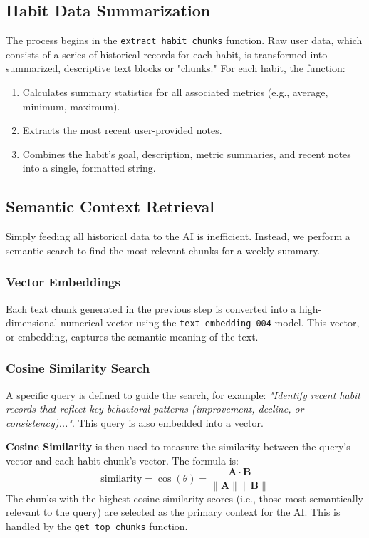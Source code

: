 \documentclass{article}
\begin{document}
\subsection{Habit Data Summarization}
The process begins in the \texttt{extract\_habit\_chunks} function. Raw user data, which consists of a series of historical records for each habit, is transformed into summarized, descriptive text blocks or "chunks." For each habit, the function:
\begin{enumerate}[noitemsep]
    \item Calculates summary statistics for all associated metrics (e.g., average, minimum, maximum).
    \item Extracts the most recent user-provided notes.
    \item Combines the habit's goal, description, metric summaries, and recent notes into a single, formatted string.
\end{enumerate}

\subsection{Semantic Context Retrieval}
Simply feeding all historical data to the AI is inefficient. Instead, we perform a semantic search to find the most relevant chunks for a weekly summary.

\subsubsection{Vector Embeddings}
Each text chunk generated in the previous step is converted into a high-dimensional numerical vector using the \texttt{text-embedding-004} model. This vector, or embedding, captures the semantic meaning of the text.

\subsubsection{Cosine Similarity Search}
A specific query is defined to guide the search, for example: \textit{"Identify recent habit records that reflect key behavioral patterns (improvement, decline, or consistency)..."}. This query is also embedded into a vector.

\textbf{Cosine Similarity} is then used to measure the similarity between the query's vector and each habit chunk's vector. The formula is:
$$ \text{similarity} = \cos(\theta) = \frac{\mathbf{A} \cdot \mathbf{B}}{\|\mathbf{A}\| \|\mathbf{B}\|} $$
The chunks with the highest cosine similarity scores (i.e., those most semantically relevant to the query) are selected as the primary context for the AI. This is handled by the \texttt{get\_top\_chunks} function.
\end{document}
